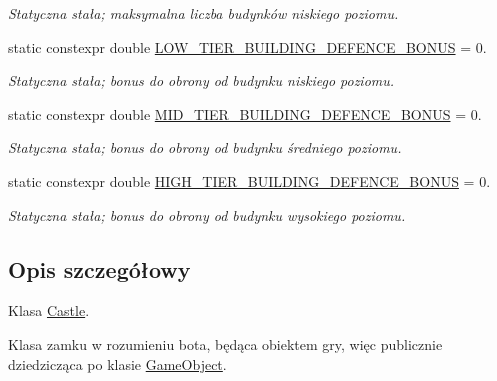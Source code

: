 \begin{DoxyCompactItemize}
\begin{DoxyCompactList}\small\item\em Statyczna stała; maksymalna liczba budynków niskiego poziomu. \end{DoxyCompactList}\item 
\mbox{\label{classmodel_1_1Castle_a8aa1907d2863606d0aab8ae449dd7d57}} 
static constexpr double \hyperlink{classmodel_1_1Castle_a8aa1907d2863606d0aab8ae449dd7d57}{L\+O\+W\+\_\+\+T\+I\+E\+R\+\_\+\+B\+U\+I\+L\+D\+I\+N\+G\+\_\+\+D\+E\+F\+E\+N\+C\+E\+\_\+\+B\+O\+N\+US} = 0.
\begin{DoxyCompactList}\small\item\em Statyczna stała; bonus do obrony od budynku niskiego poziomu. \end{DoxyCompactList}\item 
\mbox{\label{classmodel_1_1Castle_a26afa71c719e1009f3c0884e9064ae61}} 
static constexpr double \hyperlink{classmodel_1_1Castle_a26afa71c719e1009f3c0884e9064ae61}{M\+I\+D\+\_\+\+T\+I\+E\+R\+\_\+\+B\+U\+I\+L\+D\+I\+N\+G\+\_\+\+D\+E\+F\+E\+N\+C\+E\+\_\+\+B\+O\+N\+US} = 0.
\begin{DoxyCompactList}\small\item\em Statyczna stała; bonus do obrony od budynku średniego poziomu. \end{DoxyCompactList}\item 
\mbox{\label{classmodel_1_1Castle_a64d14929c22abc58acbae97420111370}} 
static constexpr double \hyperlink{classmodel_1_1Castle_a64d14929c22abc58acbae97420111370}{H\+I\+G\+H\+\_\+\+T\+I\+E\+R\+\_\+\+B\+U\+I\+L\+D\+I\+N\+G\+\_\+\+D\+E\+F\+E\+N\+C\+E\+\_\+\+B\+O\+N\+US} = 0.
\begin{DoxyCompactList}\small\item\em Statyczna stała; bonus do obrony od budynku wysokiego poziomu. \end{DoxyCompactList}\end{DoxyCompactItemize}


\subsection{Opis szczegółowy}
Klasa \hyperlink{classmodel_1_1Castle}{Castle}. 

Klasa zamku w rozumieniu bota, będąca obiektem gry, więc publicznie dziedzicząca po klasie \hyperlink{classmodel_1_1GameObject}{Game\+Object}. 

